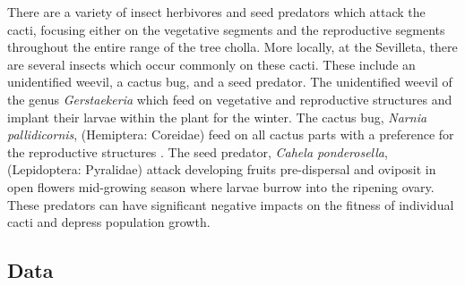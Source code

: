 \documentclass[12pt,a4paper]{article}
\begin{document}
There are a variety of insect herbivores and seed predators which attack the cacti, focusing either on the vegetative segments and the reproductive segments throughout the entire range of the tree cholla\cite{Mann1969}. 
More locally, at the Sevilleta, there are several insects which occur commonly on these cacti.
These include an unidentified weevil, a cactus bug, and a seed predator. 
The unidentified weevil of the genus \textit{Gerstaekeria} which feed on vegetative and reproductive structures and implant their larvae within the plant for the winter. 
The cactus bug, \textit{Narnia pallidicornis}, (Hemiptera: Coreidae) feed on all cactus parts with a preference for the reproductive structures \cite{Miller2006}.
The seed predator, \textit{Cahela ponderosella}, (Lepidoptera: Pyralidae) attack developing fruits pre-dispersal and oviposit in open flowers mid-growing season where larvae burrow into the ripening ovary. 
These predators can have significant negative impacts on the fitness of individual cacti and depress population growth\cite{Miller 2009}. 
	
	\subsection*{Data}
	
\end{document}
